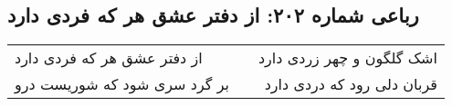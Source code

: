 \begin{center}
\section*{رباعی شماره ۲۰۲: از دفتر عشق هر که فردی دارد}
\label{sec:sh202}
\begin{longtable}{l p{0.5cm} r}
از دفتر عشق هر که فردی دارد
&&
اشک گلگون و چهر زردی دارد
\\
بر گرد سری شود که شوریست درو
&&
قربان دلی رود که دردی دارد
\\
\end{longtable}
\end{center}
